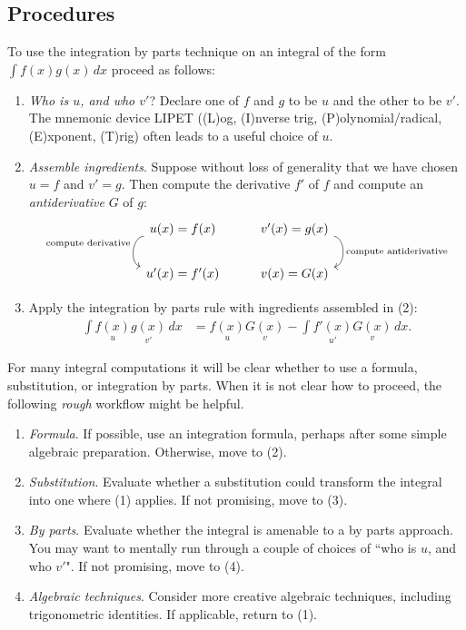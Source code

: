 \subsection*{Procedures}
\begin{namedtheorem}
To use the integration by parts technique on an integral of the form $\displaystyle\int f(x)g(x)\, dx$ proceed as follows:
\begin{enumerate}
  \item {\em Who is $u$, and who $v'$}? Declare one of $f$ and $g$ to be $u$ and the other to be $v'$. The mnemonic device LIPET ((L)og, (I)nverse trig, (P)olynomial/radical, (E)xponent, (T)rig) often leads to a useful choice of $u$.
  \item {\em Assemble ingredients}. Suppose without loss of generality that we have chosen $u=f$ and $v'=g$. Then compute the derivative $f'$ of $f$ and compute an {\em antiderivative} $G$ of $g$:
  \[
  \begin{tikzcd}
    u(x)=f(x) \ar[d,bend right=80,"\text{compute derivative}"'] & v'(x)=g(x) \ar[d,bend left=80,"\text{compute antiderivative}"]\\
    u'(x)=f'(x) & v(x)=G(x)
  \end{tikzcd}
  \]
  \item Apply the integration by parts rule with ingredients assembled in (2):
  \begin{align*}
    \int \underset{u}{f(x)}\underset{v'}{g(x)}\, dx&= \underset{u}{f(x)}\underset{v}{G(x)}-\int \underset{u'}{f'(x)}\underset{v}{G(x)}\, dx.
  \end{align*}
  \end{enumerate}

\end{namedtheorem}
\begin{namedtheorem}
For many integral computations it will be clear whether to use a formula, substitution, or integration by parts. When it is not clear how to proceed, the following {\em rough} workflow might be helpful.
\begin{enumerate}[itemsep=0pt, topsep=0pt]
  \item {\em Formula}. If possible, use an integration formula, perhaps after some simple algebraic preparation. Otherwise, move to (2).
  \item {\em Substitution}. Evaluate whether a substitution could transform the integral into one where (1) applies. If not promising, move to (3).
  \item {\em By parts}. Evaluate whether the integral is amenable to a by parts approach. You may want to mentally run through a couple of choices of ``who is $u$, and who $v'$". If not promising, move to (4).
  \item {\em Algebraic techniques}. Consider more creative algebraic techniques, including trigonometric identities. If applicable, return to (1).
\end{enumerate}

\end{namedtheorem}

